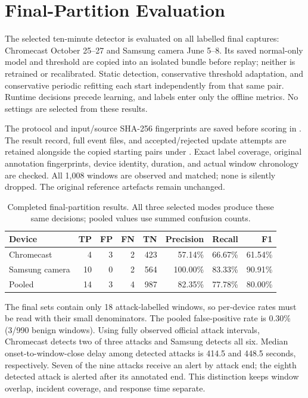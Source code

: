 \section{Final-Partition Evaluation}
\label{sec:final-evaluation}

The selected ten-minute detector is evaluated on all labelled final captures:
Chromecast October 25--27 and Samsung camera June 5--8. Its saved normal-only
model and threshold are copied into an isolated bundle before replay; neither
is retrained or recalibrated. Static detection, conservative threshold adaptation,
and conservative periodic refitting each start independently from that same
pair. Runtime decisions precede learning, and labels enter only the offline
metrics. No settings are selected from these results.

The protocol and input/source SHA-256 fingerprints are saved before scoring in
. The result record, full event
files, and accepted/rejected update attempts are retained alongside the copied
starting pairs under . Exact label coverage,
original annotation fingerprints, device identity, duration, and actual window
chronology are checked. All 1,008 windows are observed and matched; none is
silently dropped. The original reference artefacts remain unchanged.

\begin{table}[H]
\centering\small
\begin{tabular}{lrrrrrrr}
\toprule
\textbf{Device} & \textbf{TP} & \textbf{FP} & \textbf{FN} & \textbf{TN}
& \textbf{Precision} & \textbf{Recall} & \textbf{F1} \\
\midrule
Chromecast & 4 & 3 & 2 & 423 & 57.14\% & 66.67\% & 61.54\% \\
Samsung camera & 10 & 0 & 2 & 564 & 100.00\% & 83.33\% & 90.91\% \\
Pooled & 14 & 3 & 4 & 987 & 82.35\% & 77.78\% & 80.00\% \\
\bottomrule
\end{tabular}
\caption{Completed final-partition results. All three selected modes produce
these same decisions; pooled values use summed confusion counts.}
\label{tab:final-evaluation}
\end{table}

The final sets contain only 18 attack-labelled windows, so per-device rates
must be read with their small denominators. The pooled false-positive rate is
0.30\% (3/990 benign windows). Using fully observed official attack intervals,
Chromecast detects two of three attacks and Samsung detects all six. Median
onset-to-window-close delay among detected attacks is 414.5 and 448.5 seconds,
respectively. Seven of the nine attacks receive an alert by attack end; the
eighth detected attack is alerted after its annotated end. This distinction
keeps window overlap, incident coverage, and response time separate.

